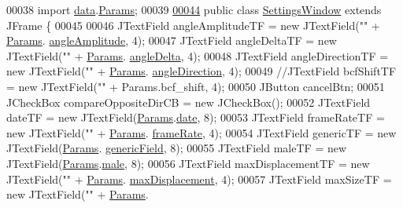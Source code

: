\begin{DoxyCode}
00038 \textcolor{keyword}{import} \hyperlink{namespacedata}{data}.\hyperlink{classdata_1_1_params}{Params};
00039 
\hypertarget{_settings_window_8java_source_l00044}{}\hyperlink{classgui_1_1_settings_window}{00044} \textcolor{keyword}{public} \textcolor{keyword}{class }\hyperlink{classgui_1_1_settings_window}{SettingsWindow} \textcolor{keyword}{extends} JFrame \{
00045 
00046   JTextField     angleAmplitudeTF      = \textcolor{keyword}{new} JTextField(\textcolor{stringliteral}{""} + \hyperlink{classdata_1_1_params}{Params}.
      \hyperlink{classdata_1_1_params_a42568ad774d8f4ccb9535aeda39fc883}{angleAmplitude}, 4);
00047   JTextField     angleDeltaTF          = \textcolor{keyword}{new} JTextField(\textcolor{stringliteral}{""} + \hyperlink{classdata_1_1_params}{Params}.
      \hyperlink{classdata_1_1_params_a93caa48162e34b2227a839ed71b4ed44}{angleDelta}, 4);
00048   JTextField     angleDirectionTF      = \textcolor{keyword}{new} JTextField(\textcolor{stringliteral}{""} + \hyperlink{classdata_1_1_params}{Params}.
      \hyperlink{classdata_1_1_params_a11ad187f45e1f7add56bde4071bfdf74}{angleDirection}, 4);
00049   \textcolor{comment}{//JTextField     bcfShiftTF            = new JTextField("" + Params.bcf\_shift, 4);}
00050   JButton        cancelBtn;
00051   JCheckBox      compareOppositeDirCB  = \textcolor{keyword}{new} JCheckBox();
00052   JTextField     dateTF                = \textcolor{keyword}{new} JTextField(\hyperlink{classdata_1_1_params}{Params}.\hyperlink{classdata_1_1_params_aecbab8174a6d72649883508cf9940d58}{date}, 8);
00053   JTextField     frameRateTF           = \textcolor{keyword}{new} JTextField(\textcolor{stringliteral}{""} + \hyperlink{classdata_1_1_params}{Params}.
      \hyperlink{classdata_1_1_params_a398ccb086e2e7150576bec8a5853b8e3}{frameRate}, 4);
00054   JTextField     genericTF             = \textcolor{keyword}{new} JTextField(\hyperlink{classdata_1_1_params}{Params}.
      \hyperlink{classdata_1_1_params_a253e4e926c0399ed1ae42b5a5989824d}{genericField}, 8);
00055   JTextField     maleTF                = \textcolor{keyword}{new} JTextField(\hyperlink{classdata_1_1_params}{Params}.\hyperlink{classdata_1_1_params_a3e07114fb70a676dfe24fad6be8c3c75}{male}, 8);
00056   JTextField     maxDisplacementTF     = \textcolor{keyword}{new} JTextField(\textcolor{stringliteral}{""} + \hyperlink{classdata_1_1_params}{Params}.
      \hyperlink{classdata_1_1_params_ab28f784a26ca9d2ce7d7a785b158aa61}{maxDisplacement}, 4);
00057   JTextField     maxSizeTF             = \textcolor{keyword}{new} JTextField(\textcolor{stringliteral}{""} + \hyperlink{classdata_1_1_params}{Params}.

\end{DoxyCode}

